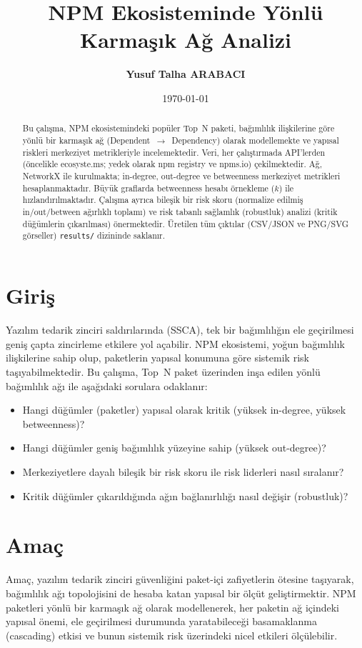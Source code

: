 \documentclass[11pt,a4paper]{article}
\title{NPM Ekosisteminde Yönlü Karmaşık Ağ Analizi}
\author{\textbf{Yusuf Talha ARABACI}}
\date{\today}
\begin{document}
\maketitle

\begin{abstract}
Bu çalışma, NPM ekosistemindeki popüler Top~N paketi, bağımlılık ilişkilerine göre yönlü bir karmaşık ağ (Dependent~$\to$~Dependency) olarak modellemekte ve yapısal riskleri merkeziyet metrikleriyle incelemektedir. Veri, her çalıştırmada API'lerden (öncelikle ecosyste.ms; yedek olarak npm registry ve npms.io) çekilmektedir. Ağ, NetworkX ile kurulmakta; in-degree, out-degree ve betweenness merkeziyet metrikleri hesaplanmaktadır. Büyük graflarda betweenness hesabı örnekleme ($k$) ile hızlandırılmaktadır. Çalışma ayrıca bileşik bir risk skoru (normalize edilmiş in/out/between ağırlıklı toplamı) ve risk tabanlı sağlamlık (robustluk) analizi (kritik düğümlerin çıkarılması) önermektedir. Üretilen tüm çıktılar (CSV/JSON ve PNG/SVG görseller) \texttt{results/} dizininde saklanır.
\end{abstract}

\clearpage

\section{Giriş}
Yazılım tedarik zinciri saldırılarında (SSCA), tek bir bağımlılığın ele geçirilmesi geniş çapta zincirleme etkilere yol açabilir. NPM ekosistemi, yoğun bağımlılık ilişkilerine sahip olup, paketlerin yapısal konumuna göre sistemik risk taşıyabilmektedir. Bu çalışma, Top~N paket üzerinden inşa edilen yönlü bağımlılık ağı ile aşağıdaki sorulara odaklanır:
\begin{itemize}
  \item Hangi düğümler (paketler) yapısal olarak kritik (yüksek in-degree, yüksek betweenness)?
  \item Hangi düğümler geniş bağımlılık yüzeyine sahip (yüksek out-degree)?
  \item Merkeziyetlere dayalı bileşik bir risk skoru ile risk liderleri nasıl sıralanır?
  \item Kritik düğümler çıkarıldığında ağın bağlanırlılığı nasıl değişir (robustluk)?
\end{itemize}

\section{Amaç}
Amaç, yazılım tedarik zinciri güvenliğini paket-içi zafiyetlerin ötesine taşıyarak, bağımlılık ağı topolojisini de hesaba katan yapısal bir ölçüt geliştirmektir. NPM paketleri yönlü bir karmaşık ağ olarak modellenerek, her paketin ağ içindeki yapısal önemi, ele geçirilmesi durumunda yaratabileceği basamaklanma (cascading) etkisi ve bunun sistemik risk üzerindeki nicel etkileri ölçülebilir.
\end{document}

